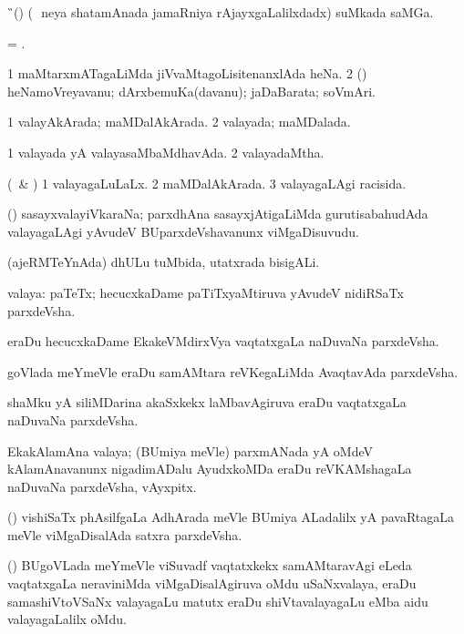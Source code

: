 \bentry 
{} 
\gl{\nA} 
\bmng
\G\
(\ca) (\kanmu\ \,neya shatamAnada jamaRniya rAjayxgaLalilxdadx) suMkada saMGa.
\emng
\eentry

\bentry
{} 
\gl{\nA} 
\bmng
= .
\emng 
\eentry

\bentry
{} 
\gl{\nA} 
\bmng
\bnum
\num{1} maMtarxmATagaLiMda jiVvaMtagoLisitenanxlAda heNa. 
\num{2} (\AmA) heNamoVreyavanu;  dArxbemuKa(davanu); jaDaBarata; soVmAri.
\enum
\emng
\eentry
 
\bentry
{} 
\gl{\gu} 
\bmng
\bnum
\num{1} valayAkArada; maMDalAkArada. 
\num{2} valayada; maMDalada.
\enum
\emng
\eentry

\bentry
{} 
\gl{\gu} 
\bmng
\bnum
\num{1} valayada yA valayasaMbaMdhavAda. 
\num{2} valayadaMtha.
\enum
\emng
\eentry

\bentry
{} 
\gl{\gu}
\bmng
(\savi\ \& \pArxvi) 
\bnum
\num{1} valayagaLuLaLx. 
\num{2} maMDalAkArada. 
\num{3} valayagaLAgi racisida.
\enum
\emng
\eentry

\bentry
{}  
\gl{\nA}  
\bmng
(\savi) sasayxvalayiVkaraNa; parxdhAna sasayxjAtigaLiMda gurutisabahudAda valayagaLAgi yAvudeV BUparxdeVshavanunx viMgaDisuvudu.
\emng
\eentry

\bentry
{} 
\gl{\nA} 
\bmng
(ajeRMTeYnAda) dhULu tuMbida, utatxrada bisigALi. 
\emng
\eentry

\bentry
{} 
\gl{\nA}
\bmng
\bnum
{} valaya: 
\banum
{} paTeTx; hecucxkaDame paTiTxyaMtiruva yAvudeV nidiRSaTx parxdeVsha.  

 eraDu hecucxkaDame EkakeVMdirxVya vaqtatxgaLa naDuvaNa parxdeVsha. 

 goVlada meYmeVle eraDu samAMtara reVKegaLiMda AvaqtavAda parxdeVsha. 

 shaMku yA siliMDarina akaSxkekx laMbavAgiruva eraDu vaqtatxgaLa naDuvaNa parxdeVsha.  

\hypertarget{zone(1)1e}{}
 EkakAlamAna valaya; (BUmiya meVle) parxmANada yA oMdeV kAlamAnavanunx nigadimADalu AyudxkoMDa eraDu reVKAMshagaLa naDuvaNa parxdeVsha, vAyxpitx.  

 (\BUvi) vishiSaTx phAsilfgaLa AdhArada meVle BUmiya ALadalilx yA pavaRtagaLa meVle viMgaDisalAda satxra parxdeVsha.

 (\BUgoV) BUgoVLada meYmeVle viSuvadf vaqtatxkekx samAMtaravAgi eLeda  vaqtatxgaLa neraviniMda viMgaDisalAgiruva oMdu uSaNxvalaya, eraDu samashiVtoVSaNx valayagaLu matutx eraDu shiVtavalayagaLu eMba aidu valayagaLalilx oMdu. \quad\quad {} 

